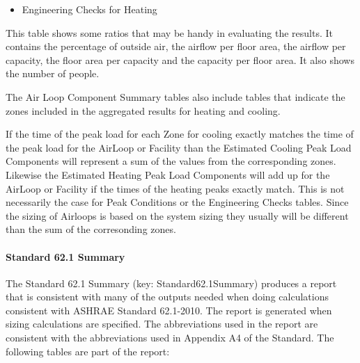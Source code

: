 \begin{itemize}
\tightlist
\item
  Engineering Checks for Heating
\end{itemize}

This table shows some ratios that may be handy in evaluating the results. It contains the percentage of outside air, the airflow per floor area, the airflow per capacity, the floor area per capacity and the capacity per floor area. It also shows the number of people.

The Air Loop Component Summary tables also include tables that indicate the zones included in the aggregated results for heating and cooling.

If the time of the peak load for each Zone for cooling exactly matches the time of the peak load for the AirLoop or Facility than the Estimated Cooling Peak Load Components will represent a sum of the values from the corresponding zones. Likewise the Estimated Heating Peak Load Components will add up for the AirLoop or Facility if the times of the heating peaks exactly match. This is not necessarily the case for Peak Conditions or the Engineering Checks tables. Since the sizing of Airloops is based on the system sizing they usually will be different than the sum of the corresonding zones. 

\paragraph{Standard 62.1 Summary}\label{standard-62.1-summary}

The Standard 62.1 Summary (key: Standard62.1Summary) produces a report that is consistent with many of the outputs needed when doing calculations consistent with ASHRAE Standard 62.1-2010. The report is generated when sizing calculations are specified. The abbreviations used in the report are consistent with the abbreviations used in Appendix A4 of the Standard. The following tables are part of the report:

